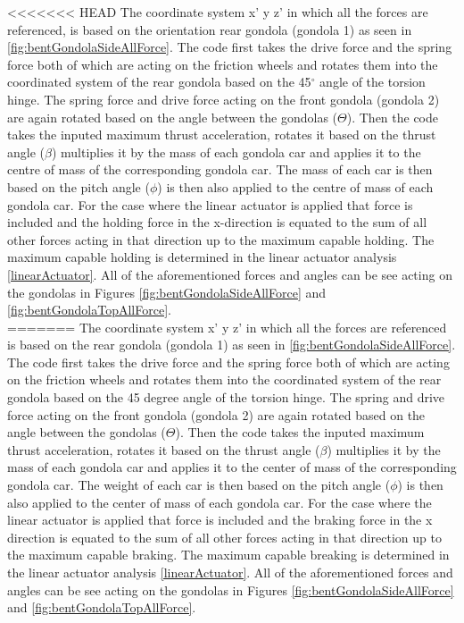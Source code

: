 \documentclass[../main.tex]{subfiles}
\begin{document}
<<<<<<< HEAD
The coordinate system x' y z' in which all the forces are referenced, is based on the orientation rear gondola (gondola 1) as seen in \ref{fig:bentGondolaSideAllForce}. The code first takes the drive force and the spring force both of which are acting on the friction wheels and rotates them into the coordinated system of the rear gondola based on the 45$^{\circ}$ angle of the torsion hinge. The spring force and drive force acting on the front gondola (gondola 2) are again rotated based on the angle between the gondolas ($\Theta$). Then the code takes the inputed maximum thrust acceleration, rotates it based on the thrust angle ($\beta$) multiplies it by the mass of each gondola car and applies it to the centre of mass of the corresponding gondola car. The mass of each car is then based on the pitch angle ($\phi$) is then also applied to the centre of mass of each gondola car. For the case where the linear actuator is applied that force is included and the holding force in the x-direction is equated to the sum of all other forces acting in that direction up to the maximum capable holding. The maximum capable holding is determined in the linear actuator analysis \ref{linearActuator}. All of the aforementioned forces and angles can be see acting on the gondolas in Figures \ref{fig:bentGondolaSideAllForce} and \ref{fig:bentGondolaTopAllForce}. \\
=======
The coordinate system x' y z' in which all the forces are referenced is based on the rear gondola (gondola 1) as seen in \ref{fig:bentGondolaSideAllForce}. The code first takes the drive force and the spring force both of which are acting on the friction wheels and rotates them into the coordinated system of the rear gondola based on the 45 degree angle of the torsion hinge. The spring and drive force acting on the front gondola (gondola 2) are again rotated based on the angle between the gondolas ($\Theta$). Then the code takes the inputed maximum thrust acceleration, rotates it based on the thrust angle ($\beta$) multiplies it by the mass of each gondola car and applies it to the center of mass of the corresponding gondola car. The weight of each car is then based on the pitch angle ($\phi$) is then also applied to the center of mass of each gondola car. For the case where the linear actuator is applied that force is included and the braking force in the x direction is equated to the sum of all other forces acting in that direction up to the maximum capable braking. The maximum capable breaking is determined in the linear actuator analysis \ref{linearActuator}. All of the aforementioned forces and angles can be see acting on the gondolas in Figures \ref{fig:bentGondolaSideAllForce} and \ref{fig:bentGondolaTopAllForce}. \\
\end{document}
